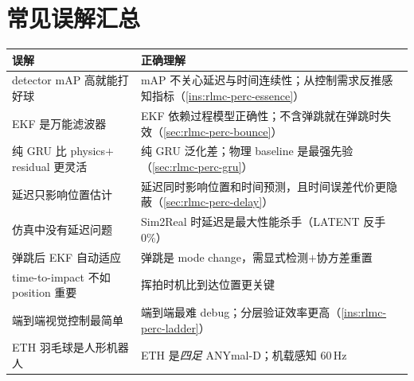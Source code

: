 
\begin{practice}[本节动手任务]
\end{practice}

\section*{常见误解汇总}
\label{sec:rlmc-perc-myths}

\begin{center}
\small
\begin{tabular}{@{}p{6.2cm}p{8.0cm}@{}}
\toprule
误解 & 正确理解 \\
\midrule
detector mAP 高就能打好球 & mAP 不关心延迟与时间连续性；从控制需求反推感知指标（\cref{ins:rlmc-perc-essence}） \\
EKF 是万能滤波器 & EKF 依赖过程模型正确性；不含弹跳就在弹跳时失效（\cref{sec:rlmc-perc-bounce}） \\
纯 GRU 比 physics$+$residual 更灵活 & 纯 GRU 泛化差；物理 baseline 是最强先验（\cref{sec:rlmc-perc-gru}） \\
延迟只影响位置估计 & 延迟同时影响位置和时间预测，且时间误差代价更隐蔽（\cref{sec:rlmc-perc-delay}） \\
仿真中没有延迟问题 & Sim2Real 时延迟是最大性能杀手（LATENT 反手 $0\%$） \\
弹跳后 EKF 自动适应 & 弹跳是 mode change，需显式检测$+$协方差重置 \\
time-to-impact 不如 position 重要 & 挥拍时机比到达位置更关键 \\
端到端视觉控制最简单 & 端到端最难 debug；分层验证效率更高（\cref{ins:rlmc-perc-ladder}） \\
ETH 羽毛球是人形机器人 & ETH 是\emph{四足} ANYmal-D；机载感知 $60$\,Hz \\
\bottomrule
\end{tabular}
\end{center}

